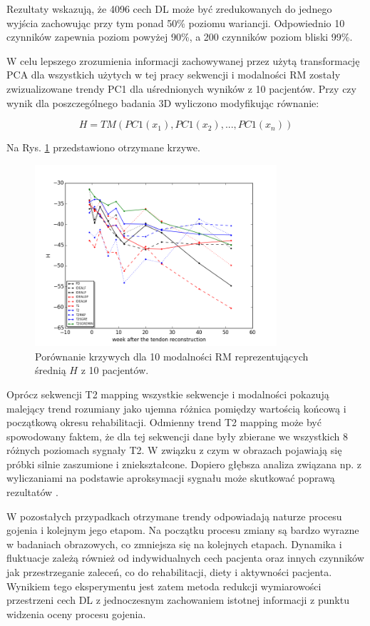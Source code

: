 Rezultaty wskazują, że 4096 cech DL może być zredukowanych do jednego wyjścia zachowując przy tym ponad 50\% poziomu wariancji. Odpowiednio 10 czynników zapewnia poziom powyżej 90\%, a 200 czynników poziom bliski 99\%. 

W celu lepszego zrozumienia informacji zachowywanej przez użytą transformację PCA dla wszystkich użytych w tej pracy sekwencji i modalności RM zostały zwizualizowane trendy PC1 dla uśrednionych wyników z 10 pacjentów. Przy czy wynik dla poszczególnego badania 3D wyliczono modyfikując równanie:  

\begin{equation}
H = TM(PC1(x_1), PC1(x_2),..., PC1(x_n))
\end{equation}

Na Rys. \ref{fig:H} przedstawiono otrzymane krzywe.

\begin{figure}[h!]
	\centering
	\includegraphics[width=0.8\textwidth]{figures/H_PC1.png}
	\caption{Porównanie krzywych dla 10 modalności RM reprezentujących średnią $H$ z 10 pacjentów.}\label{fig:H}
\end{figure}

Oprócz sekwencji T2 mapping wszystkie sekwencje i modalności pokazują malejący trend rozumiany jako ujemna różnica pomiędzy wartością końcową i początkową okresu rehabilitacji. Odmienny trend T2 mapping może być spowodowany faktem, że dla tej sekwencji dane były zbierane we wszystkich 8 różnych poziomach sygnały T2. W związku z czym w obrazach pojawiają się próbki silnie zaszumione i zniekształcone. Dopiero głębsza analiza związana np. z wyliczaniami na podstawie aproksymacji sygnału może skutkować poprawą rezultatów \cite{Regulski2017}. 

W pozostałych przypadkach otrzymane trendy odpowiadają naturze procesu gojenia i kolejnym jego etapom. Na początku procesu zmiany są bardzo wyrazne w badaniach obrazowych, co zmniejsza się na kolejnych etapach. Dynamika i fluktuacje zależą również od indywidualnych cech pacjenta oraz innych czynników jak przestrzeganie zaleceń, co do rehabilitacji, diety i aktywności pacjenta. Wynikiem tego eksperymentu jest zatem metoda redukcji wymiarowości przestrzeni cech DL z jednoczesnym zachowaniem istotnej informacji z punktu widzenia oceny procesu gojenia. 


